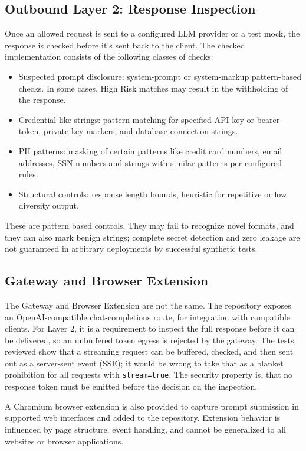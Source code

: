 \documentclass[conference]{IEEEtran}
\begin{document}
\subsection{Outbound Layer 2: Response Inspection}
Once an allowed request is sent to a configured LLM provider or a test mock, the response is checked before it's sent back to the client. The checked implementation consists of the following classes of checks:
\begin{itemize}
    \item Suspected prompt disclosure: system-prompt or system-markup pattern-based checks. In some cases, High Risk matches may result in the withholding of the response.
    \item Credential-like strings: pattern matching for specified API-key or bearer token, private-key markers, and database connection strings.
    \item PII patterns: masking of certain patterns like credit card numbers, email addresses, SSN numbers and strings with similar patterns per configured rules.
    \item Structural controls: response length bounds, heuristic for repetitive or low diversity output.
\end{itemize}
These are pattern based controls. They may fail to recognize novel formats, and they can also mark benign strings; complete secret detection and zero leakage are not guaranteed in arbitrary deployments by successful synthetic tests.

\subsection{Gateway and Browser Extension}
The Gateway and Browser Extension are not the same. The repository exposes an OpenAI-compatible chat-completions route, for integration with compatible clients. For Layer 2, it is a requirement to inspect the full response before it can be delivered, so an unbuffered token egress is rejected by the gateway. The tests reviewed show that a streaming request can be buffered, checked, and then sent out as a server-sent event (SSE); it would be wrong to take that as a blanket prohibition for all requests with \texttt{stream=true}. The security property is, that no response token must be emitted before the decision on the inspection.

A Chromium browser extension is also provided to capture prompt submission in supported web interfaces and added to the repository. Extension behavior is influenced by page structure, event handling, and cannot be generalized to all websites or browser applications.
\end{document}
